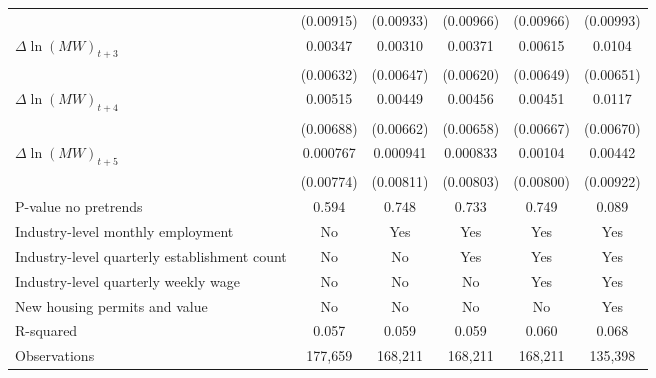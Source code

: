{\begin{tabular}{l*{5}{c}}
          &(0.00915)         &(0.00933)         &(0.00966)         &(0.00966)         &(0.00993)         \\
[1em]
$\Delta \ln(MW)_{t+3}$&  0.00347         &  0.00310         &  0.00371         &  0.00615         &   0.0104         \\
          &(0.00632)         &(0.00647)         &(0.00620)         &(0.00649)         &(0.00651)         \\
[1em]
$\Delta \ln(MW)_{t+4}$&  0.00515         &  0.00449         &  0.00456         &  0.00451         &   0.0117\sym{*}  \\
          &(0.00688)         &(0.00662)         &(0.00658)         &(0.00667)         &(0.00670)         \\
[1em]
$\Delta \ln(MW)_{t+5}$& 0.000767         & 0.000941         & 0.000833         &  0.00104         &  0.00442         \\
          &(0.00774)         &(0.00811)         &(0.00803)         &(0.00800)         &(0.00922)         \\
\hline
P-value no pretrends&    0.594         &    0.748         &    0.733         &    0.749         &    0.089         \\
Industry-level monthly employment&       No         &      Yes         &      Yes         &      Yes         &      Yes         \\
Industry-level quarterly establishment count&       No         &       No         &      Yes         &      Yes         &      Yes         \\
Industry-level quarterly weekly wage&       No         &       No         &       No         &      Yes         &      Yes         \\
New housing permits and value&       No         &       No         &       No         &       No         &      Yes         \\
R-squared &    0.057         &    0.059         &    0.059         &    0.060         &    0.068         \\
Observations&  177,659         &  168,211         &  168,211         &  168,211         &  135,398         \\
\hline\hline
\end{tabular}
}
